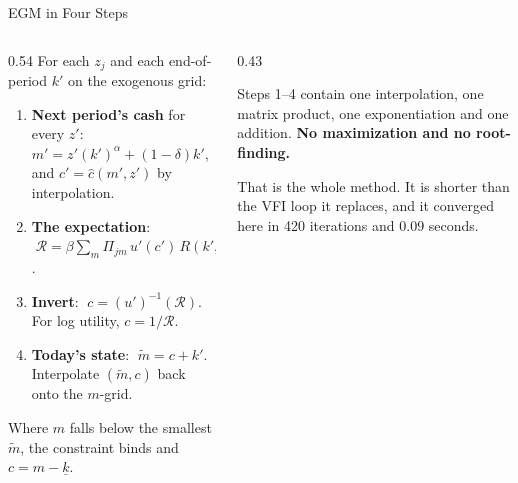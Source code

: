 \begin{frame}{EGM in Four Steps}
\begin{columns}[T]
\begin{column}{0.54\textwidth}
\small
For each $z_j$ and each end-of-period $k'$ on the exogenous grid:
\medskip
\begin{enumerate}\footnotesize
  \item \textbf{Next period's cash} for every $z'$:
        $m'=z'(k')^{\alpha}+(1-\delta)k'$, and $c'=\hat c(m',z')$ by interpolation.
  \item \textbf{The expectation}:
        $\;\mathcal{R}=\beta\sum_{m}\Pi_{jm}\,u'(c')\,R(k',z_m)$.
  \item \textbf{Invert}: $\;c=(u')^{-1}(\mathcal{R})$. \;For log utility, $c=1/\mathcal{R}$.
  \item \textbf{Today's state}: $\;\tilde m=c+k'$. Interpolate $(\tilde m,c)$ back onto the $m$-grid.
\end{enumerate}
\medskip
\footnotesize
Where $m$ falls below the smallest $\tilde m$, the constraint binds and $c=m-\underline{k}$.
\end{column}
\begin{column}{0.43\textwidth}
\begin{conceptbox}[title=\textbf{Count the solves}]\small
Steps 1--4 contain one interpolation, one matrix product, one exponentiation and one addition. \textbf{No maximization and no root-finding.}
\end{conceptbox}
\medskip
\begin{examplebox}\footnotesize
That is the whole method. It is shorter than the VFI loop it replaces, and it converged here in 420 iterations and 0.09 seconds.
\end{examplebox}
\end{column}
\end{columns}
\vspace{1mm}
\end{frame}

